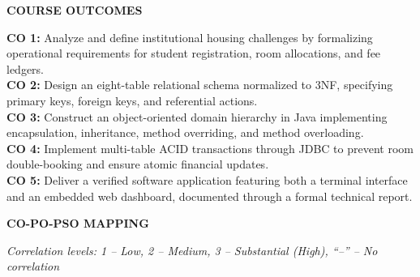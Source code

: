 \documentclass[12pt,a4paper]{report}
\begin{document}
\newpage

\begin{center}
{\Large \textbf{COURSE OUTCOMES}\par}
\end{center}
\vspace{0.2cm}

\noindent \textbf{CO 1:} Analyze and define institutional housing challenges by formalizing operational requirements for student registration, room allocations, and fee ledgers.\\[0.2cm]
\noindent \textbf{CO 2:} Design an eight-table relational schema normalized to 3NF, specifying primary keys, foreign keys, and referential actions.\\[0.2cm]
\noindent \textbf{CO 3:} Construct an object-oriented domain hierarchy in Java implementing encapsulation, inheritance, method overriding, and method overloading.\\[0.2cm]
\noindent \textbf{CO 4:} Implement multi-table ACID transactions through JDBC to prevent room double-booking and ensure atomic financial updates.\\[0.2cm]
\noindent \textbf{CO 5:} Deliver a verified software application featuring both a terminal interface and an embedded web dashboard, documented through a formal technical report.

\vspace{0.5cm}
\begin{center}
{\Large \textbf{CO-PO-PSO MAPPING}\par}
\end{center}
\vspace{0.2cm}

\noindent \textit{Correlation levels: 1 -- Low, 2 -- Medium, 3 -- Substantial (High), ``--'' -- No correlation}

\vspace{0.3cm}
\begin{table}[h]
\centering
{}
\end{table}
\end{document}
